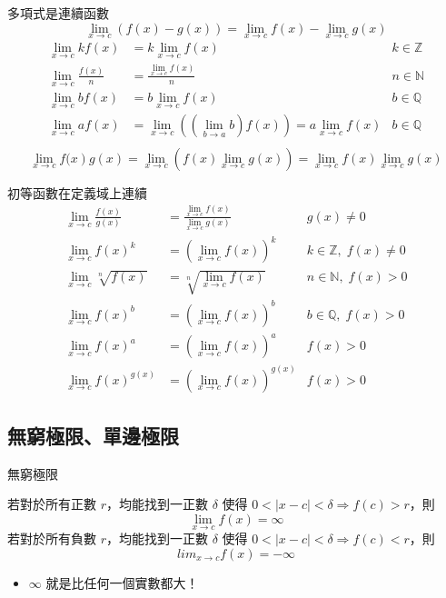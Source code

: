 \documentclass{beamer}
\begin{document}
\begin{CJK}{UTF8}{bsmi}
\begin{frame}{多項式是連續函數}
  \[\lim_{x \to c} (f(x) - g(x)) = \lim_{x \to c} f(x) - \lim_{x \to c} g(x)\]
  \begin{align*}
    \lim_{x \to c} k f(x) &= k \lim_{x \to c} f(x)                               &k \in \mathbb Z\\
    \lim_{x \to c} \frac{f(x)}{n} &= \frac{\displaystyle \lim_{x \to c} f(x)}{n} &n \in \mathbb N\\
    \lim_{x \to c} b f(x) &= b \lim_{x \to c} f(x)                               &b \in \mathbb Q\\
    \lim_{x \to c} a f(x) &= \lim_{x \to c} \left(\left( \lim_{b \to a} b \right) f(x) \right) = a \lim_{x \to c} f(x)
      &b \in \mathbb Q\\
  \end{align*}
  \[\lim_{x \to c} f(\left. x \right) g(x) = \lim_{x \to c} \left( f(x) \lim_{x \to c} g(x) \right)
      = \lim_{x \to c} f(x) \lim_{x \to c} g(x)\]
\end{frame}

\begin{frame}{初等函數在定義域上連續}
  \begin{align*}
    \lim_{x \to c} \frac{f(x)}{g(x)}
	&= \frac{\displaystyle \lim_{x \to c} f(x)}{\displaystyle \lim_{x \to c} g(x)} &g(x) \ne 0\\
    \lim_{x \to c} f(x)^k &= \left( \lim_{x \to c} f(x) \right)^k                      &k \in \mathbb Z,\; f(x) \ne 0\\
    \lim_{x \to c} \sqrt[n]{f(x)} &= \sqrt[n]{\displaystyle \lim_{x \to c} f(x)}       &n \in \mathbb N,\; f(x) > 0\\
    \lim_{x \to c} f(x)^b &= \left( \lim_{x \to c} f(x) \right)^b                      &b \in \mathbb Q,\; f(x) > 0\\
    \lim_{x \to c} f(x)^a      &= \left( \lim_{x \to c} f(x) \right)^a      &f(x) > 0\\
    \lim_{x \to c} f(x)^{g(x)} &= \left( \lim_{x \to c} f(x) \right)^{g(x)} &f(x) > 0
  \end{align*}
\end{frame}

\subsection{無窮極限、單邊極限}
\begin{frame}{無窮極限}
  \begin{definition}
    若對於所有正數 $r$，均能找到一正數 $\delta$ 使得 $0 < |x-c| < \delta \Rightarrow f(c) > r$，則
    \[\lim_{x \to c} f(x) = \infty\]
    若對於所有負數 $r$，均能找到一正數 $\delta$ 使得 $0 < |x-c| < \delta \Rightarrow f(c) < r$，則
    \[lim_{x \to c} f(x) = -\infty\]
  \end{definition}
  \begin{itemize}
    \item $\infty$ 就是比任何一個實數都大！
  \end{itemize}
\end{frame}


\end{CJK}
\end{document}
